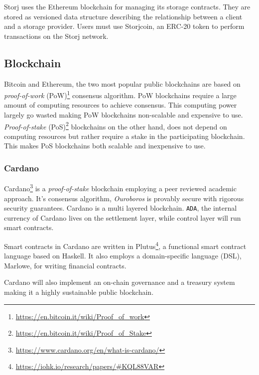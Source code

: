 				Storj uses the Ethereum blockchain for managing its storage contracts. They are stored as versioned data structure describing the relationship between a client and a storage provider. Users must use Storjcoin, an ERC-20 token to perform transactions on the Storj network.
				
		\subsection{Blockchain}
			Bitcoin\cite{nakamoto2008bitcoin} and Ethereum\cite{buterin2014ethereum}, the two most popular public blockchains are based on \textit{proof-of-work} (PoW)\footnote{\url{https://en.bitcoin.it/wiki/Proof_of_work}} consensus algorithm. PoW blockchains require a large amount of computing resources to achieve consensus. This computing power largely go wasted making PoW blockchains non-scalable and expensive to use. \textit{Proof-of-stake} (PoS)\footnote{\url{https://en.bitcoin.it/wiki/Proof_of_Stake}} blockchains on the other hand, does not depend on computing resources but rather require a stake in the participating blockchain. This makes PoS blockchains both scalable and inexpensive to use.
			
				\subsubsection{Cardano}
				Cardano\footnote{\url{https://www.cardano.org/en/what-is-cardano/}} is a \textit{proof-of-stake} blockchain employing a peer reviewed academic approach. It's consensus algorithm, \textit{Ouroboros}\cite{kiayias2017ouroboros} is provably secure with rigorous security guarantees. Cardano is a multi layered blockchain. \texttt{ADA}, the internal currency of Cardano lives on the settlement layer, while control layer will run smart contracts.
				
				Smart contracts in Cardano are written in Plutus\footnote{\url{https://iohk.io/research/papers/\#KQL88VAR}}, a functional smart contract language based on Haskell. It also employs a domain-specific language (DSL), Marlowe\cite{seijas2018marlowe}, for writing financial contracts.
				
				Cardano will also implement an on-chain governance and a {treasury system}\cite{zhang2019treasury} making it a highly sustainable public blockchain.